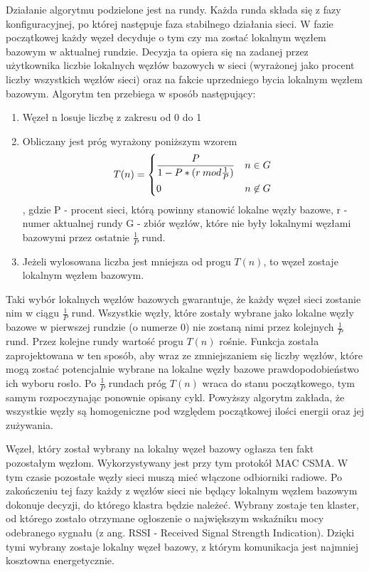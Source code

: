 Działanie algorytmu podzielone jest na rundy. Każda runda składa się z fazy konfiguracyjnej, po której następuje faza stabilnego działania sieci. W fazie początkowej każdy węzeł decyduje o tym czy ma zostać lokalnym węzłem bazowym w aktualnej rundzie. Decyzja ta opiera się na zadanej przez użytkownika liczbie lokalnych węzłów bazowych w sieci (wyrażonej jako procent liczby wszystkich węzłów sieci) oraz na fakcie uprzedniego bycia lokalnym węzłem bazowym.
Algorytm ten przebiega w sposób następujący:
\begin{enumerate}
	\item Węzeł n losuje liczbę z zakresu od 0 do 1
	\item Obliczany jest próg wyrażony poniższym wzorem
	\[T(n) = \begin{dcases} 
      \frac{P}{1-P*(r\:mod\frac{1}{P})} & n \in G \\
      0 & n \not\in G \\
   \end{dcases}
	\]
	, gdzie P - procent sieci, którą powinny stanowić lokalne węzły bazowe,
	r - numer aktualnej rundy
	G - zbiór węzłów, które nie były lokalnymi węzłami bazowymi przez ostatnie $\frac{1}{P}$ rund.
	\item Jeżeli wylosowana liczba jest mniejsza od progu $T(n)$, to węzeł zostaje lokalnym węzłem bazowym.
\end{enumerate}
Taki wybór lokalnych węzłów bazowych gwarantuje, że każdy węzeł sieci zostanie nim w ciągu $\frac{1}{P}$ rund. Wszystkie węzły, które zostały wybrane jako lokalne węzły bazowe w pierwszej rundzie (o numerze 0) nie zostaną nimi przez kolejnych $\frac{1}{P}$ rund. Przez kolejne rundy wartość progu $T(n)$ rośnie. Funkcja została zaprojektowana w ten sposób, aby wraz ze zmniejszaniem się liczby węzłów, które mogą zostać potencjalnie wybrane na lokalne węzły bazowe prawdopodobieństwo ich wyboru rosło. Po $\frac{1}{P}$ rundach próg $T(n)$ wraca do stanu początkowego, tym samym rozpoczynając ponownie opisany cykl.
Powyższy algorytm zakłada, że wszystkie węzły są homogeniczne pod względem początkowej ilości energii oraz jej zużywania.

Węzeł, który został wybrany na lokalny węzeł bazowy ogłasza ten fakt  pozostałym węzłom. Wykorzystywany jest przy tym protokół MAC CSMA. W tym czasie pozostałe węzły sieci muszą mieć włączone odbiorniki radiowe. Po zakończeniu tej fazy każdy z węzłów sieci nie będący lokalnym węzłem bazowym dokonuje decyzji, do którego klastra będzie należeć. Wybrany zostaje ten klaster, od którego zostało otrzymane ogłoszenie o największym wskaźniku mocy odebranego sygnału (z ang. RSSI - Received Signal Strength Indication). Dzięki tymi wybrany zostaje lokalny węzeł bazowy, z którym komunikacja jest najmniej kosztowna energetycznie.

